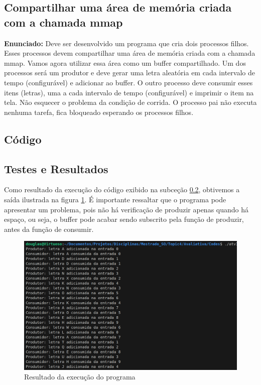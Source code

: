 \documentclass{article}
\begin{document}
\subsection{Compartilhar uma área de memória criada com a chamada mmap}
\textbf{Enunciado:} Deve ser desenvolvido um programa que cria dois processos filhos. Esses processos devem compartilhar uma área de memória criada com a chamada mmap. Vamos agora utilizar essa área como um buffer compartilhado. Um dos processos será um produtor e deve gerar uma letra aleatória em cada intervalo de tempo (configurável) e adicionar ao buffer. O outro processo deve consumir esses itens (letras), uma a cada intervalo de tempo (configurável) e imprimir o item na tela. Não esquecer o problema da condição de corrida. O processo pai não executa nenhuma tarefa, fica bloqueado esperando os processos filhos. \newline

\subsection{Código}
\label{sub-sec-cod}

\subsection{Testes e Resultados}
Como resultado da execução do código exibido na subceção \ref{sub-sec-cod}, obtivemos a saída ilustrada na figura \ref{fig:exec}. É importante ressaltar que o programa pode apresentar um problema, pois não há verificação de produzir apenas quando há espaço, ou seja, o buffer pode acabar sendo subscrito pela função de produzir, antes da função de consumir. 

\begin{figure}[ht]
    \centering
    \includegraphics[width=1\textwidth]{./Images/image.png}
    \caption{Resultado da execução do programa}
    \label{fig:exec}
\end{figure}

\printbibliography %
\end{document}
